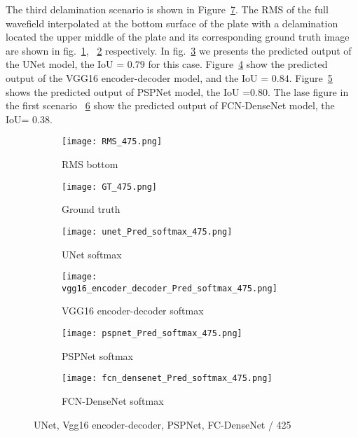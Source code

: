 The third delamination scenario is shown in Figure~\ref{fig:475_softmax}. 
The RMS of the full wavefield interpolated at the bottom surface of the plate with a delamination located the upper middle  of the plate and its corresponding ground truth image are shown in fig.~\ref{fig:RMS_flat_shell_Vz_475}, ~\ref{fig:m1_rand_single_delam_475} respectively. 
In fig.~\ref{fig:Unet_Pred__softmax_475} we presents the predicted output of the UNet model, the IoU = \(0.79\) for this case.
Figure~\ref{fig:vgg16_pred__softmax_475} show the predicted output of the VGG16 encoder-decoder model, and the IoU = \(0.84\). 
Figure~\ref{fig:pspnet_pred__softmax_475} shows the predicted output of PSPNet model, the IoU =\(0.80\).
The lase figure in the first scenario ~\ref{fig:fcn_densenet_pred__softmax_475}	show the predicted output of FCN-DenseNet model, the IoU= \(0.38\).
\begin{figure}[!h]
	\centering
	\begin{subfigure}[b]{0.47\textwidth}
		\centering
		\texttt{[image: RMS\_475.png]}
		\caption{RMS bottom}
		\label{fig:RMS_flat_shell_Vz_475}
	\end{subfigure}
	\hfill
	\begin{subfigure}[b]{0.47\textwidth}
		\centering
		\texttt{[image: GT\_475.png]}
		\caption{Ground truth}
		\label{fig:m1_rand_single_delam_475}
	\end{subfigure}
	\begin{subfigure}[b]{0.47\textwidth}
		\centering
		\texttt{[image: unet\_Pred\_softmax\_475.png]}
		\caption{UNet softmax}
		\label{fig:Unet_Pred__softmax_475}
	\end{subfigure}
	\hfill
	\begin{subfigure}[b]{0.47\textwidth}
		\centering
		\texttt{[image: vgg16\_encoder\_decoder\_Pred\_softmax\_475.png]}
		\caption{VGG16 encoder-decoder softmax}			\label{fig:vgg16_pred__softmax_475}			
	\end{subfigure}
	\hfill
	\begin{subfigure}[b]{0.47\textwidth}
		\centering
		\texttt{[image: pspnet\_Pred\_softmax\_475.png]}
		\caption{PSPNet softmax}
		\label{fig:pspnet_pred__softmax_475}
	\end{subfigure}	
	\hfill
	\begin{subfigure}[b]{0.47\textwidth}
		\centering
		\texttt{[image: fcn\_densenet\_Pred\_softmax\_475.png]}
		\caption{FCN-DenseNet softmax}
		\label{fig:fcn_densenet_pred__softmax_475}
	\end{subfigure}	
	\caption{UNet, Vgg16 encoder-decoder, PSPNet, FC-DenseNet /  425}
	\label{fig:475_softmax}
\end{figure}

